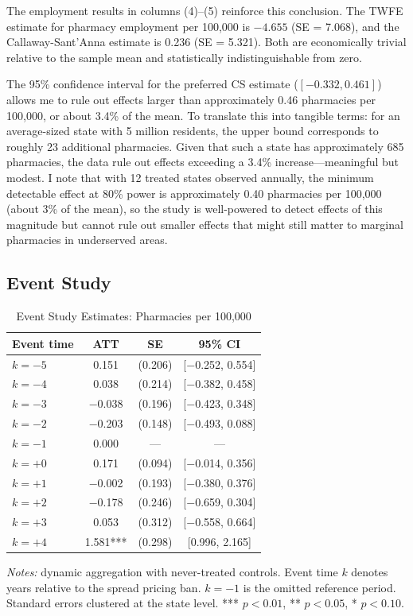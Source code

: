 \documentclass[12pt]{article}
\begin{document}
The employment results in columns (4)--(5) reinforce this conclusion. The TWFE estimate for pharmacy employment per 100,000 is $-4.655$ (SE = 7.068), and the Callaway-Sant'Anna estimate is 0.236 (SE = 5.321). Both are economically trivial relative to the sample mean and statistically indistinguishable from zero.

The 95\% confidence interval for the preferred CS estimate ($[-0.332, 0.461]$) allows me to rule out effects larger than approximately 0.46 pharmacies per 100,000, or about 3.4\% of the mean. To translate this into tangible terms: for an average-sized state with 5 million residents, the upper bound corresponds to roughly 23 additional pharmacies. Given that such a state has approximately 685 pharmacies, the data rule out effects exceeding a 3.4\% increase---meaningful but modest. I note that with 12 treated states observed annually, the minimum detectable effect at 80\% power is approximately 0.40 pharmacies per 100,000 (about 3\% of the mean), so the study is well-powered to detect effects of this magnitude but cannot rule out smaller effects that might still matter to marginal pharmacies in underserved areas.

\subsection{Event Study}

\begin{table}[htbp]
\centering
\caption{Event Study Estimates: Pharmacies per 100,000}
\label{tab:eventstudy}
\begin{threeparttable}
\begin{tabular}{lccc}
\toprule
Event time & ATT & SE & 95\% CI \\
\midrule
$k = -5$ & 0.151 & (0.206) & [$-$0.252, 0.554] \\
$k = -4$ & 0.038 & (0.214) & [$-$0.382, 0.458] \\
$k = -3$ & $-$0.038 & (0.196) & [$-$0.423, 0.348] \\
$k = -2$ & $-$0.203 & (0.148) & [$-$0.493, 0.088] \\
$k = -1$ & 0.000 & --- & --- \\
$k = +0$ & 0.171 & (0.094) & [$-$0.014, 0.356] \\
$k = +1$ & $-$0.002 & (0.193) & [$-$0.380, 0.376] \\
$k = +2$ & $-$0.178 & (0.246) & [$-$0.659, 0.304] \\
$k = +3$ & 0.053 & (0.312) & [$-$0.558, 0.664] \\
$k = +4$ & 1.581*** & (0.298) & [0.996, 2.165] \\
\bottomrule
\end{tabular}
\begin{tablenotes}[flushleft]\small
\item \textit{Notes:} \citet{callaway2021difference} dynamic aggregation with never-treated controls. Event time $k$ denotes years relative to the spread pricing ban. $k = -1$ is the omitted reference period. Standard errors clustered at the state level. *** $p<0.01$, ** $p<0.05$, * $p<0.10$.
\end{tablenotes}
\end{threeparttable}
\end{table}
\end{document}
